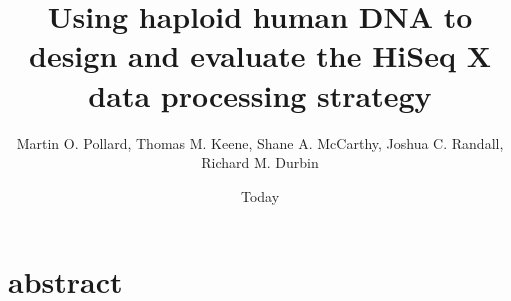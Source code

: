 \documentclass{article}
\begin{document}
\title{Using haploid human DNA to design and evaluate the HiSeq X data processing strategy}
\author{Martin O. Pollard, Thomas M. Keene, Shane A. McCarthy, Joshua C. Randall, Richard M. Durbin}
\date{Today}
\maketitle

\section{abstract}

{}
\end{document}
